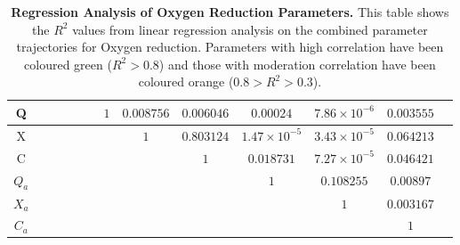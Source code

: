 \begin{table}[tbp]
{\begin{minipage}{24.4cm}
\begin{tabular}{|c|c|c|c|c|c|c|c|c|c|c|c|c|}
    \hline
    \cellcolor{dark-gray}Q & \cellcolor{light-gray} & \cellcolor{light-gray} & \cellcolor{light-gray} & \cellcolor{light-gray} & \cellcolor{light-gray} & \cellcolor{light-gray}$1$ & $0.008756$ & $0.006046$ & $0.00024$ & $7.86\times{}10^{-6}$ & $0.003555$ \\
    \hline
    \cellcolor{dark-gray}X & \cellcolor{light-gray} & \cellcolor{light-gray} & \cellcolor{light-gray} & \cellcolor{light-gray} & \cellcolor{light-gray} & \cellcolor{light-gray} & \cellcolor{light-gray}$1$ & \cellcolor{green}$0.803124$ & $1.47\times{}10^{-5}$ & $3.43\times{}10^{-5}$ & $0.064213$ \\
    \hline
    \cellcolor{dark-gray}C & \cellcolor{light-gray} & \cellcolor{light-gray} & \cellcolor{light-gray} & \cellcolor{light-gray} & \cellcolor{light-gray} & \cellcolor{light-gray} & \cellcolor{light-gray} & \cellcolor{light-gray}$1$ & $0.018731$ & $7.27\times{}10^{-5}$ & $0.046421$ \\
    \hline
    \cellcolor{dark-gray}$Q_a$ & \cellcolor{light-gray} & \cellcolor{light-gray} & \cellcolor{light-gray} & \cellcolor{light-gray} & \cellcolor{light-gray} & \cellcolor{light-gray} & \cellcolor{light-gray} & \cellcolor{light-gray} & \cellcolor{light-gray}$1$ & $0.108255$ & $0.00897$ \\
    \hline
    \cellcolor{dark-gray}$X_a$ & \cellcolor{light-gray} & \cellcolor{light-gray} & \cellcolor{light-gray} & \cellcolor{light-gray} & \cellcolor{light-gray} & \cellcolor{light-gray} & \cellcolor{light-gray} & \cellcolor{light-gray} & \cellcolor{light-gray} & \cellcolor{light-gray}$1$ & $0.003167$ \\
    \hline
    \cellcolor{dark-gray}$C_a$ & \cellcolor{light-gray} & \cellcolor{light-gray} & \cellcolor{light-gray} & \cellcolor{light-gray} & \cellcolor{light-gray} & \cellcolor{light-gray} & \cellcolor{light-gray} & \cellcolor{light-gray} & \cellcolor{light-gray} & \cellcolor{light-gray} & \cellcolor{light-gray}$1$ \\
    \hline
  \end{tabular}
  \caption[Regression Analysis of Oxygen Reduction Parameters]{{\bf Regression Analysis of Oxygen Reduction Parameters.} This table shows the $R^2$ values from linear regression analysis on the combined parameter trajectories for Oxygen reduction. Parameters with high correlation have been coloured green ($R^2>0.8$) and those with moderation correlation have been coloured orange ($0.8>R^2>0.3$).
  \label{tab:oxyregress}}
  \end{minipage}
  }
\end{table}
